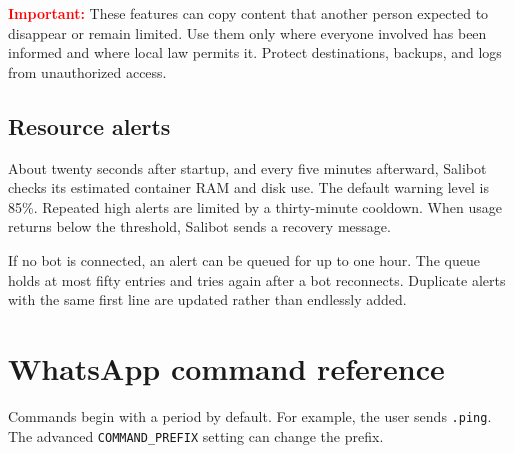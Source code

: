 \documentclass[11pt,a4paper]{article}
\newcommand{\warning}[1]{\textcolor{red}{\textbf{Important:}} #1}
\begin{document}
\warning{These features can copy content that another person expected to disappear or remain limited. Use them only where everyone involved has been informed and where local law permits it. Protect destinations, backups, and logs from unauthorized access.}

\subsection{Resource alerts}

About twenty seconds after startup, and every five minutes afterward, Salibot checks its estimated container RAM and disk use. The default warning level is 85\%. Repeated high alerts are limited by a thirty-minute cooldown. When usage returns below the threshold, Salibot sends a recovery message.

If no bot is connected, an alert can be queued for up to one hour. The queue holds at most fifty entries and tries again after a bot reconnects. Duplicate alerts with the same first line are updated rather than endlessly added.

\section{WhatsApp command reference}

Commands begin with a period by default. For example, the user sends \texttt{.ping}. The advanced \texttt{COMMAND\_PREFIX} setting can change the prefix.
\end{document}

